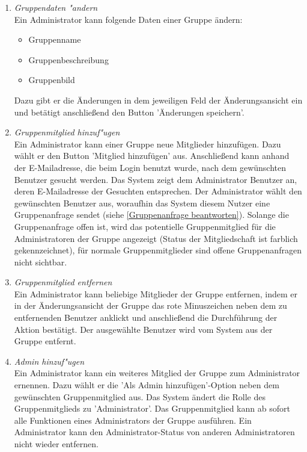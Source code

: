 \documentclass[parskip=full]{scrartcl}
\def\threedigits#1{%
  \ifnum#1<100 0\fi
  \ifnum#1<10 0\fi
  \number#1}
\begin{document}
\begin{enumerate}[label={\textbf{/F\protect\threedigits{\theenumi}0/}}, leftmargin=*, resume]

	\item \textit{Gruppendaten "andern}\label{Gruppendaten ändern}\\
	Ein Administrator kann folgende Daten einer Gruppe ändern:
	\begin{itemize}
	\item Gruppenname
	\item \colorbox{shadecolor}{Gruppenbeschreibung}
	\item \colorbox{shadecolor}{Gruppenbild}
	\end{itemize}
	Dazu gibt er die Änderungen in dem jeweiligen Feld der Änderungsansicht ein und betätigt anschließend den Button 'Änderungen speichern'.
	
	\item \textit{Gruppenmitglied hinzuf"ugen}\label{Mitglieder hinzufügen} \\
	Ein Administrator kann einer Gruppe neue Mitglieder hinzufügen. Dazu wählt er den Button 'Mitglied hinzufügen' aus. Anschließend kann anhand der E-Mailadresse, die beim Login benutzt wurde, nach dem gewünschten Benutzer gesucht werden. Das System zeigt dem Administrator Benutzer an, deren E-Mailadresse der Gesuchten entsprechen. Der Administrator wählt den gewünschten Benutzer aus, woraufhin das System diesem Nutzer eine Gruppenanfrage sendet (siehe \ref{Gruppenanfrage beantworten}). Solange die Gruppenanfrage offen ist, wird das potentielle Gruppenmitglied für die Administratoren der Gruppe angezeigt (Status der Mitgliedschaft ist farblich gekennzeichnet), für normale Gruppenmitglieder sind offene Gruppenanfragen nicht sichtbar.
	
	\item \textit{Gruppenmitglied entfernen}\label{Gruppenmitglied entfernen}\\
	Ein Administrator kann beliebige Mitglieder der Gruppe entfernen, indem er in der Änderungsansicht der Gruppe das rote Minuszeichen neben dem zu entfernenden Benutzer anklickt und anschließend die Durchführung der Aktion bestätigt. Der ausgewählte Benutzer wird vom System aus der Gruppe entfernt.
	
	\item \colorbox{shadecolor}{\textit{Admin hinzuf"ugen}}\label{Admin hinzufügen} \\
	Ein Administrator kann ein weiteres Mitglied der Gruppe zum Administrator ernennen. Dazu wählt er die 'Als Admin hinzufügen'-Option neben dem gewünschten Gruppenmitglied aus. Das System ändert die Rolle des Gruppenmitglieds zu 'Administrator'. Das Gruppenmitglied kann ab sofort alle Funktionen eines Administrators der Gruppe ausführen. Ein Administrator kann den Administrator-Status von anderen Administratoren nicht wieder entfernen.


\end{enumerate}
\end{document}
